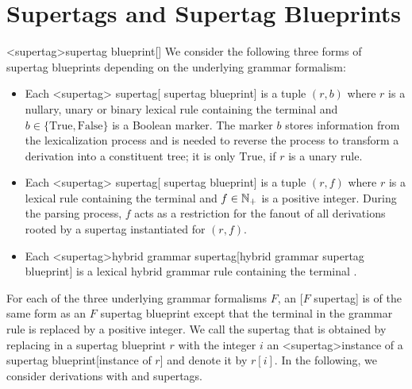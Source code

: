 \documentclass[../../document.tex]{subfiles}
\begin{document}
    \section{Supertags and Supertag Blueprints}\label{sec:supertags}<supertag>{supertag blueprint}[]
    We consider the following three forms of supertag blueprints depending on the underlying grammar formalism:
    \begin{itemize}
        \item
            Each <supertag>{ supertag}[ supertag blueprint] is a tuple \((r, b)\) where \(r\) is a nullary, unary or binary lexical  rule containing the terminal \wildcard{} and \(b \in \{\text{True}, \text{False}\}\) is a Boolean marker.
            The marker \(b\) stores information from the lexicalization process and is needed to reverse the process to transform a derivation into a constituent tree; it is only \(\text{True}\), if \(r\) is a unary rule.
        \item
            Each <supertag>{ supertag}[ supertag blueprint] is a tuple \((r, f)\) where \(r\) is a lexical  rule containing the terminal \wildcard{} and \(f \in \mathbb{N}_+\) is a positive integer.
            During the parsing process, \(f\) acts as a restriction for the fanout of all derivations rooted by a supertag instantiated for \((r,f)\).
        \item Each <supertag>{hybrid grammar supertag}[hybrid grammar supertag blueprint] is a lexical hybrid grammar rule containing the terminal \wildcard{}.
    \end{itemize}
    For each of the three underlying grammar formalisms \(F\), an [\(F\) supertag] is of the same form as an \(F\) supertag blueprint except that the terminal \wildcard{} in the grammar rule is replaced by a positive integer.
    We call the supertag that is obtained by replacing \wildcard{} in a supertag blueprint \(r\) with the integer \(i\) an <supertag>{instance of a supertag blueprint}[instance of \(r\)] and denote it by \(r[i]\).
    In the following, we consider derivations with  and  supertags.
\end{document}
